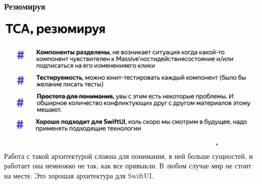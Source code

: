 \documentclass{article}
\begin{document}
    \subsubsection{Резюмируя}
    \includegraphics[scale = 0.5]{pic/Снимок экрана 2023-07-30 в 22.22.22.png}
    Работа с такой архитектурой сложна для понимания, в ней больше сущностей, и работает она немножко не так, как все привыкли. В любом случае мир не стоит на месте. Это хорошая архитектура для SwiftUI.
\end{document}
